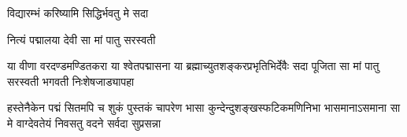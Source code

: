 
{विद्यारम्भं करिष्यामि सिद्धिर्भवतु मे सदा}

{नित्यं पद्मालया देवी सा मां पातु सरस्वती}

{या वीणा वरदण्डमण्डितकरा या श्वेतपद्मासना}
{या ब्रह्माच्युतशङ्करप्रभृतिभिर्देवैः सदा पूजिता}
{सा मां पातु सरस्वती भगवती निःशेषजाड्यापहा}

{हस्तेनैकेन पद्मं सितमपि च शुकं पुस्तकं चापरेण}
{भासा कुन्देन्दुशङ्खस्फटिकमणिनिभा भासमानाऽसमाना}
{सा मे वाग्देवतेयं निवसतु वदने सर्वदा सुप्रसन्ना}

\closesection